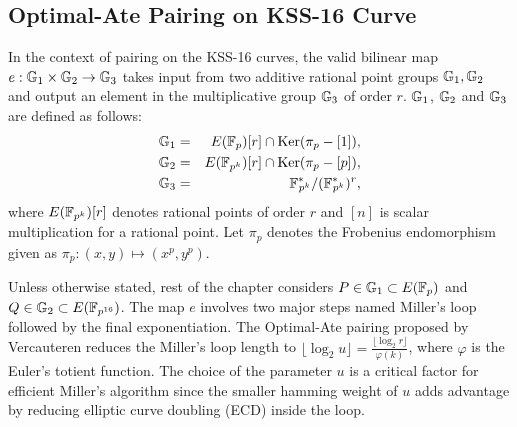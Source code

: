 \subsection{Optimal-Ate Pairing on KSS-16 Curve}
In the context of pairing on the KSS-16 curves, the valid bilinear map $e:{\mathbb{G}}_{1} \times {\mathbb{G}}_{2} \rightarrow {\mathbb{G}}_{3}$ takes input from two additive rational point groups ${\mathbb{G}}_{1}, {\mathbb{G}}_{2}$ 
and output an element in the multiplicative group ${\mathbb{G}}_{3}$ of order $r$. 
${\mathbb{G}}_{1}$, ${\mathbb{G}}_{2}$ and ${\mathbb{G}}_{3}$ are defined as follows:
\begin{eqnarray}
{\mathbb{G}}_{1} & = &  E(\mathbb{F}_p) [r] \cap \text{Ker}(\pi_p - [1]), \nonumber \\
{\mathbb{G}}_{2} & = &  E({\mathbb{F}}_{p^{k}}) [r] \cap \text{Ker}(\pi_p - [p]), \nonumber \\
{\mathbb{G}}_{3} & = & {{\mathbb{F}}^{\ast}}_{\!\!\!p^{k}}/({{\mathbb{F}}^{\ast}}_{\!\!\!p^{k}})^r, \nonumber
\end{eqnarray}
where $E({\mathbb{F}}_{p^{k}})[r]$ denotes rational points of order $r$ and $[n]$ is scalar multiplication for a rational point. 
Let $\pi_p$ denotes the Frobenius endomorphism given as $\pi_p: (x,y) \mapsto (x^p,y^p)$.

Unless otherwise stated, rest of the chapter considers $P \in {\mathbb{G}}_{1} \subset E(\mathbb{F}_p)$ and  $Q \in {\mathbb{G}}_{2} \subset  E(\mathbb{F}_{p^{16}})$. The map $e$ involves two major steps named Miller's loop followed by the final exponentiation.
The Optimal-Ate pairing \cite{DBLP:journals/tit/Vercauteren10} proposed by Vercauteren reduces the Miller's loop length  to $\lfloor \log_2 u \rfloor = \frac{\lfloor \log_2 r \rfloor }{\varphi(k)} $, where $\varphi$ is the Euler's totient function.
The choice of the parameter $u$ is a critical factor for efficient Miller's algorithm since the smaller hamming weight of $u$ adds advantage by reducing elliptic curve doubling (ECD) inside the loop.

